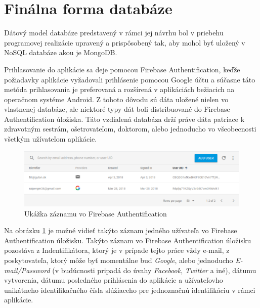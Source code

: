\section{Finálna forma databáze}
Dátový model databáze predstavený v rámci jej návrhu bol v priebehu programovej realizácie upravený a prispôsobený tak, aby mohol byť uložený v NoSQL databáze akou je MongoDB. 

Prihlasovanie do aplikácie sa deje pomocou Firebase Authentification, keďže požiadavky aplikácie vyžadovali prihlásenie pomocou Google účtu a súčasne táto metóda prihlasovania je preferovaná a rozšírená v aplikáciách bežiacich na operačnom systéme Android. Z tohoto dôvodu sú dáta uložené nielen vo vlastnenej databáze, ale niektoré typy dát boli distribuované do Firebase Authentification úložiska. Táto vzdialená databáza drží práve dáta patriace k zdravotným sestrám, ošetrovateľom, doktorom, alebo jednoducho vo všeobecnosti všetkým užívateľom aplikácie.

\begin{figure}[h]
  \centering
  \includegraphics[scale=0.45]{fig/firebase.png}
  \caption{Ukážka záznamu vo Firebase Authentification}
  \label{fig:firebase}
\end{figure}
Na obrázku \ref{fig:firebase} je možné vidieť takýto záznam jedného užívateľa vo Firebase Authentification úložisku. Takýto záznam vo Firebase Authentification úložisku pozostáva z Indentifikátora, ktorý je v prípade tejto práce vždy e-mail, z poskytovateľa, ktorý môže byť momentálne buď \textit{Google}, alebo jednoducho  \textit{E-mail/Password} (v budúcnosti pripadá do úvahy  \textit{Facebook},  \textit{Twitter} a iné), dátumu vytvorenia, dátumu posledného prihlásenia do aplikácie a užívateľovho unikátneho identifikačného čísla slúžiaceho pre jednoznačnú identifikáciu v rámci aplikácie. 

